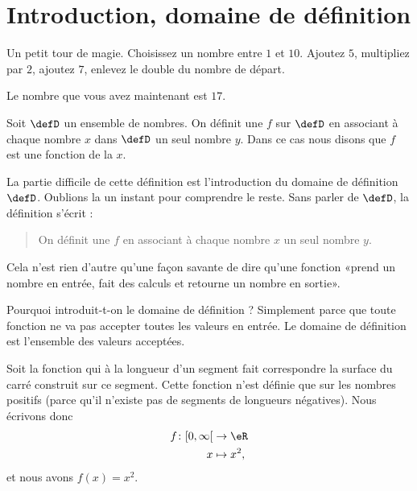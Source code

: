 
\section{Introduction, domaine de définition}


\begin{example} \label{ExemVmCkIH}
    Un petit tour de magie. Choisissez un nombre entre \( 1\) et \( 10\). Ajoutez \( 5\), multipliez par \( 2\), ajoutez \( 7\), enlevez le double du nombre de départ.

    Le nombre que vous avez maintenant est \( 17\).
\end{example}

\begin{definition}
    Soit \( \defD\) un ensemble de nombres. On définit une  \( f\) sur \( \defD\) en associant à chaque nombre \( x\) dans \( \defD\) un seul nombre \( y\). Dans ce cas nous disons que \( f\) est une fonction de la  \( x\).
\end{definition}

La partie difficile de cette définition est l'introduction du domaine de définition \( \defD\). Oublions la un instant pour comprendre le reste. Sans parler de \( \defD\), la définition s'écrit :

\begin{quote}
    On définit une  \( f\) en associant à chaque nombre \( x\) un seul nombre \( y\).
\end{quote}
Cela n'est rien d'autre qu'une façon savante de dire qu'une fonction «prend un nombre en entrée, fait des calculs et retourne un nombre en sortie».

Pourquoi introduit-t-on le domaine de définition ? Simplement parce que toute fonction ne va pas accepter toutes les valeurs en entrée. Le domaine de définition est l'ensemble des valeurs acceptées.

\begin{example}
    Soit la fonction qui à la longueur d'un segment fait correspondre la surface du carré construit sur ce segment. Cette fonction n'est définie que sur les nombres positifs (parce qu'il n'existe pas de segments de longueurs négatives). Nous écrivons donc
    \begin{equation}
        \begin{aligned}
            f\colon \mathopen[ 0 , \infty [&\to \eR \\
            x&\mapsto x^2,
        \end{aligned}
    \end{equation}
    et nous avons \( f(x)=x^2\).
\end{example}

